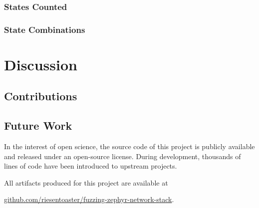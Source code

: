 \documentclass{article}
\begin{document}
\begin{multicols}{2}
  \subsubsection{States Counted}

  \subsubsection{State Combinations}

  \section{Discussion}

  \subsection{Contributions}

  \subsection{Future Work}

\end{multicols}
\vspace{30px}
\begin{center}
  \begin{minipage}{0.65\textwidth}
    \centering
    In the interest of open science, the source code of this project is publicly available and released under an open-source license. During development, thousands of lines of code have been introduced to upstream projects.

    All artifacts produced for this project are available at

    \vspace{8px}

    \href{https://github.com/riesentoaster/fuzzing-zephyr-network-stack}{github.com/riesentoaster/fuzzing-zephyr-network-stack}.
  \end{minipage}
\end{center}

\vspace{50px}

\end{document}
